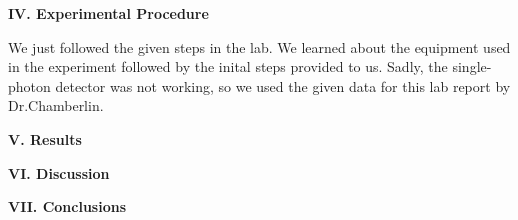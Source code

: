 \documentclass[fleqn]{article}
\begin{document}
  
  \vspace{20px}


  \textbf{IV. Experimental Procedure}

  \vspace{10px}

  We just followed the given steps in the lab. We learned about the equipment used in the experiment followed
  by the inital steps provided to us. Sadly, the single-photon detector was not working, so 
  we used the given data for this lab report by Dr.Chamberlin. \textcite{Four}
  
  \vspace{20px}


  \textbf{V. Results}

  \vspace{10px}

  
  \vspace{20px}


  \textbf{VI. Discussion}

  \vspace{10px}

  
  \vspace{20px}


  \textbf{VII. Conclusions}

  \vspace{10px}

  
  \vspace{20px}

  
  \printbibliography
\end{document}
